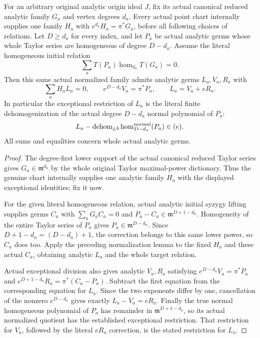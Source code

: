 \begin{theorem}
\label{hir:actual-original-point-normalized-initial-relation-lifts}
\leanok
For an arbitrary original analytic origin ideal $J$, fix its actual
canonical reduced analytic family $G_a$ and vertex degrees $d_a$.
Every actual point chart internally supplies one family $H_a$ with
$e^{d_a}H_a=\pi^*G_a$, before all following choices of relations.
Let $D\ge d_a$ for every index, and let $P_a$ be actual analytic germs
whose whole Taylor series are homogeneous of degree $D-d_a$.
Assume the literal homogeneous initial relation
\[
 \sum_a T(P_a)\operatorname{hom}_{d_a}T(G_a)=0.
\]
Then this same actual normalized family admits analytic germs $L_a,V_a,R_a$
with
\[
 \sum_a H_aL_a=0,\qquad
 e^{D-d_a}V_a=\pi^*P_a,\qquad L_a=V_a+eR_a.
\]
In particular the exceptional restriction of $L_a$ is the literal
finite dehomogenization of the actual degree $D-d_a$ normal polynomial
of $P_a$:
\[
 L_a-\operatorname{dehom}_{j,b}
    \operatorname{hom}^{\rm normal}_{D-d_a}(P_a)\in(e).
\]
All sums and equalities concern whole actual analytic germs.
\end{theorem}
\begin{proof}
The degree-first lower support of the actual canonical reduced Taylor
series gives $G_a\in\mathfrak m^{d_a}$ by the whole original Taylor
maximal-power dictionary. Thus the genuine chart internally supplies
one analytic family $H_a$ with the displayed exceptional identities;
fix it now.

For the given literal homogeneous relation, actual analytic initial
syzygy lifting supplies germs $C_a$ with $\sum_aG_aC_a=0$ and
$P_a-C_a\in\mathfrak m^{D+1-d_a}$. Homogeneity of the entire Taylor
series of $P_a$ gives $P_a\in\mathfrak m^{D-d_a}$. Since
$D+1-d_a=(D-d_a)+1$, the correction belongs to this same lower power,
so $C_a$ does too. Apply the preceding normalization lemma to the
fixed $H_a$ and these actual $C_a$, obtaining analytic $L_a$ and the
whole target relation.

Actual exceptional division also gives analytic $V_a,R_a$ satisfying
$e^{D-d_a}V_a=\pi^*P_a$ and
$e^{D+1-d_a}R_a=\pi^*(C_a-P_a)$. Subtract the first equation from
the corresponding equation for $L_a$. Since the two exponents differ
by one, cancellation of the nonzero $e^{D-d_a}$ gives exactly
$L_a-V_a=eR_a$. Finally the true normal homogeneous polynomial of
$P_a$ has remainder in $\mathfrak m^{D+1-d_a}$, so its actual
normalized quotient has the established exceptional restriction.
That restriction for $V_a$, followed by the literal $eR_a$ correction,
is the stated restriction for $L_a$.
\end{proof}


